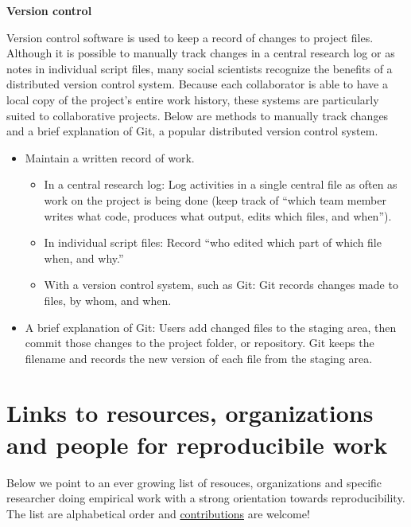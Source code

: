 \documentclass[]{book}
\providecommand{\tightlist}{%
  \setlength{\itemsep}{0pt}\setlength{\parskip}{0pt}}
\begin{document}
\textbf{Version control}

Version control software is used to keep a record of changes to project files. Although it is possible to manually track changes in a central research log or as notes in individual script files, many social scientists recognize the benefits of a distributed version control system. Because each collaborator is able to have a local copy of the project's entire work history, these systems are particularly suited to collaborative projects. Below are methods to manually track changes and a brief explanation of Git, a popular distributed version control system.

\begin{itemize}
\tightlist
\item
  Maintain a written record of work.

  \begin{itemize}
  \tightlist
  \item
    In a central research log: Log activities in a single central file as often as work on the project is being done (keep track of ``which team member writes what code, produces what output, edits which files, and when'').
  \item
    In individual script files: Record ``who edited which part of which file when, and why.''
  \item
    With a version control system, such as Git: Git records changes made to files, by whom, and when.
  \end{itemize}
\item
  A brief explanation of Git: Users add changed files to the staging area, then commit those changes to the project folder, or repository. Git keeps the filename and records the new version of each file from the staging area.
\end{itemize}

\hypertarget{links-to-resources-organizations-and-people-for-reproducibile-work}{%
\section{Links to resources, organizations and people for reproducibile work}\label{links-to-resources-organizations-and-people-for-reproducibile-work}}

Below we point to an ever growing list of resouces, organizations and specific researcher doing empirical work with a strong orientation towards reproducibility. The list are alphabetical order and \protect\hyperlink{contrib-guide}{contributions} are welcome!
\end{document}
